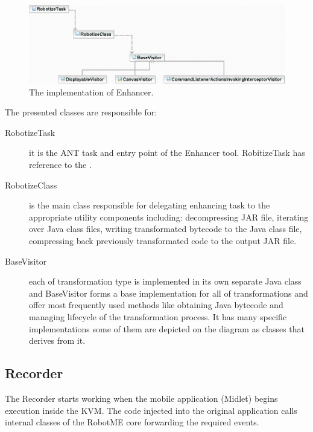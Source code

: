 \begin{figure}[t]%
\begin{center}
\includegraphics[width=\linewidth]{figures/uml-diagram-enhancer}
\end{center}
\caption{The implementation of Enhancer.}%
\label{fig:uml-diagram-enhancer}
\end{figure}

The presented classes are responsible for:

\begin{description}
    \item[RobotizeTask] it is the ANT task and entry point of the Enhancer tool. RobitizeTask has reference to the 
.

    \item[RobotizeClass] is the main class responsible for delegating enhancing task to the appropriate utility components
 including: decompressing JAR file, iterating over Java class files, writing transformated bytecode to the
 Java class file, compressing back previously transformated code to the output JAR file.

    \item[BaseVisitor] each of transformation type is implemented in its own separate Java class and BaseVisitor
forms a base implementation for all of transformations and offer most frequently used methods like 
obtaining Java bytecode and managing lifecycle of the transformation process. It has many specific
implementations some of them are depicted on the diagram as classes that derives from it.
\end{description}

\subsection{Recorder}

The Recorder starts working when the mobile application (Midlet) begins execution inside
the KVM. The code injected into the original application calls internal classes 
of the RobotME core forwarding the required events. 

